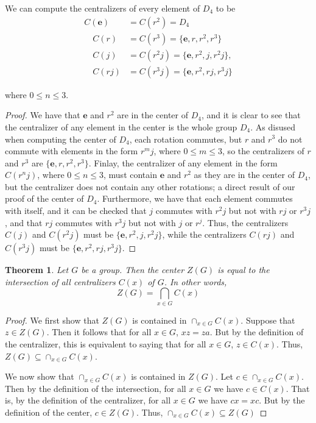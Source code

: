 \documentclass[12pt]{amsart}
\newtheorem{theorem}{Theorem}[section]
\theoremstyle{definition}
\theoremstyle{plain}
\def\id{{\mathbf e}}
\begin{document}
We can compute the centralizers of every element of $D_4$ to be
\begin{align*}
   C(\id) &= C(r^2) = D_4\\
   \quad C(r) &= C(r^3) = \{\id, r, r^2, r^3 \}\\
   \quad C(j)  &= C(r^2j)= \{\id, r^2, j, r^2j\}, \\
   \quad C(rj)  &= C(r^3j)= \{\id, r^2, rj, r^3j\} 
\end{align*}

where $0 \leq n \leq 3$.
\begin{proof}
    We have that $\id$ and $r^2$ are in the center of $D_4$, and it is clear to see that the centralizer of any element in the center is the whole group $D_4$. 
    As disused when computing the center of $D_4$, each rotation commutes, but $r$ and $r^3$ do not commute with elements in the form $r^mj$, where $0 \leq m \leq 3$, so the centralizers of $r$ and $r^3$ are $\{\id, r, r^2, r^3 \}$. 
    Finlay, the centralizer of any element in the form $C(r^nj)$, where $0 \leq n \leq 3$, must contain $\id$ and $r^2$ as they are in the center of $D_4$, but the centralizer does not contain any other rotations; a direct result of our proof of the center of $D_4$. Furthermore, we have that each element commutes with itself, and it can be checked that $j$ commutes with $r^2j$ but not with $rj$ or $r^3j$, and that $rj$ commutes with $r^3j$ but not with $j$ or $r^j$. Thus, the centralizers $C(j)$ and $C(r^2j)$ must be $\{\id, r^2, j, r^2j\}$, while the centralizers $C(rj)$ and $C(r^3j)$ must be $\{\id, r^2, rj, r^3j\}$.
\end{proof}

\begin{theorem}
Let $G$ be a group. Then the center $Z(G)$ is equal to the intersection of all centralizers $C(x)$ of $G$. In other words,
\[
Z(G) = \bigcap_{x \in G} C(x)
\]
\end{theorem}

\begin{proof}
    We first show that $Z(G)$ is contained in $\cap_{x \in G} C(x)$. Suppose that $z \in Z(G)$. Then it follows that for all $x \in G$, $xz = za$. But by the definition of the centralizer, this is equivalent to saying that for all $x \in G$, $z \in C(x)$. Thus, $Z(G) \subseteq \cap_{x \in G} C(x)$.

    We now show that $\cap_{x \in G} C(x)$ is contained in $Z(G)$. Let $c \in \cap_{x \in G} C(x)$. Then by the definition of the intersection, for all $x \in G$ we have $c \in C(x)$. That is, by the definition of the centralizer, for all $x \in G$ we have $cx = xc$. But by the definition of the center, $c \in Z(G)$. Thus, $ \cap_{x \in G} C(x) \subseteq Z(G)$ 
\end{proof}


  
\end{document}
